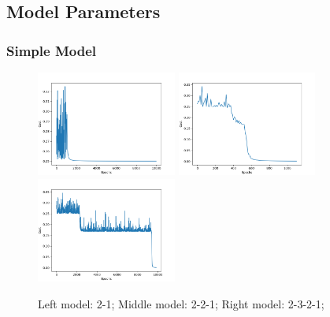 \subsection{Model Parameters}
\label{resmod}

\subsubsection{Simple Model}
\label{ressimp}
\begin{figure}[H]

\includegraphics[width=4.6cm]{images/parameters/simple/line-.png}
\includegraphics[width=4.6cm]{images/parameters/simple/line.png}
\includegraphics[width=4.6cm]{images/parameters/simple/line+.png}

\caption{Left model: 2-1; Middle model: 2-2-1; Right model: 2-3-2-1;}
\end{figure}

